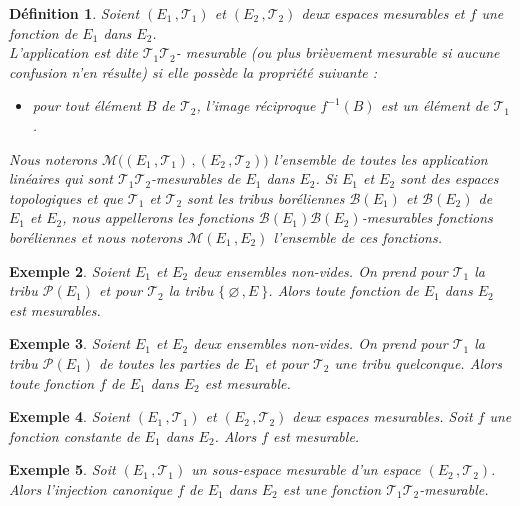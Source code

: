 \documentclass{scrreport}
\theoremstyle{def}
\newtheorem{definition}{Définition}
\newtheorem{example}[definition]{Exemple}
\theoremstyle{thm}
\theoremstyle{prop}
\theoremstyle{rem}
\numberwithin{definition}{section}
\numberwithin{lemma}{section}
\numberwithin{proposition}{section}
\numberwithin{theorem}{section}
\numberwithin{corol}{section}
\numberwithin{notation}{section}
\numberwithin{example}{section}
\numberwithin{exercise}{section}
\numberwithin{remark}{section}
\newcommand{\OO}{\varnothing}
\newcommand{\scrB}{\mathscr{B}}
\newcommand{\scrM}{\mathscr{M}}
\newcommand{\scrP}{\mathscr{P}}
\newcommand{\scrT}{\mathscr{T}}
\newcommand{\p}{\:\!}
\begin{document}
\begin{definition}\label{def1:5:1}
	Soient \((E_1\,, \scrT_1)\) et \((E_2\,, \scrT_2)\) deux espaces mesurables et \(f\) une fonction de \(E_1\) dans \(E_2\). \\ \indent
	L'application est dite \(\scrT_1 \scrT_2\)- mesurable (ou plus brièvement mesurable si aucune confusion n'en résulte) si elle possède la propriété suivante :
	\begin{itemize}
		\item pour tout élément \(B\) de \(\scrT_2\), l'image réciproque \(f^{-1}(B)\) est un élément de \(\scrT_1\).
	\end{itemize}
	
	Nous noterons \(\scrM \bigl((E_1\,, \scrT_1)\,, (E_2\,, \scrT_2)\bigr)\) l'ensemble de toutes les application linéaires qui sont \(\scrT_1 \scrT_2\)-mesurables de \(E_1\) dans \(E_2\). Si \(E_1\) et \(E_2\) sont des espaces topologiques et que \(\scrT_1\) et \(\scrT_2\) sont les tribus boréliennes \(\scrB(E_1)\) et \(\scrB(E_2)\) de \(E_1\) et \(E_2\), nous appellerons les fonctions \(\scrB(E_1) \scrB(E_2)\)-mesurables fonctions boréliennes et nous noterons \(\scrM(E_1\,, E_2)\) l'ensemble de ces fonctions.
\end{definition}

\begin{example}\label{expl1:5:2}
	Soient \(E_1\) et \(E_2\) deux ensembles non-vides. On prend pour \(\scrT_1\) la tribu \(\scrP(E_1)\) et pour \(\scrT_2\) la tribu \(\{\p \OO\,, E \p\}\). Alors toute fonction de \(E_1\) dans \(E_2\) est mesurables.
\end{example}

\begin{example}\label{expl1:5:3}
	Soient \(E_1\) et \(E_2\) deux ensembles non-vides. On prend pour \(\scrT_1\) la tribu \(\scrP(E_1)\) de toutes les parties de \(E_1\) et pour \(\scrT_2\) une tribu quelconque. Alors toute fonction \(f\) de \(E_1\) dans \(E_2\) est mesurable.
\end{example}

\begin{example}\label{expl1:5:4}
	Soient \((E_1\,, \scrT_1)\) et \((E_2\,, \scrT_2)\) deux espaces mesurables. Soit \(f\) une fonction constante de \(E_1\) dans \(E_2\). Alors \(f\) est mesurable.
\end{example}

\begin{example}\label{expl1:5:5}
	Soit \((E_1\,, \scrT_1)\) un sous-espace mesurable d'un espace \((E_2\,, \scrT_2)\). Alors l'injection canonique \(f\) de \(E_1\) dans \(E_2\) est une fonction \(\scrT_1 \scrT_2\)-mesurable.
\end{example}
\end{document}
